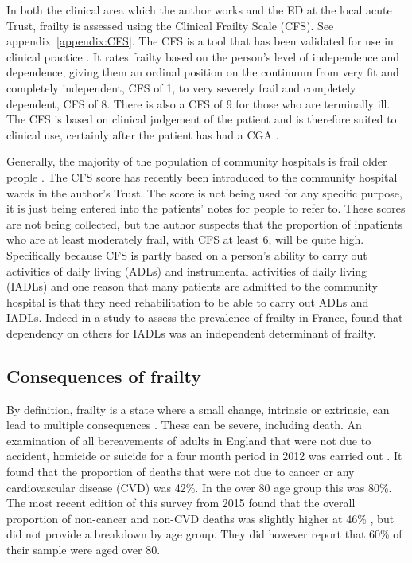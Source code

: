 \documentclass
[
	12pt,
	a4paper,
	oneside,
]{article}
\begin{document}
In both the clinical area which the author works and the ED at
the local acute Trust, frailty is assessed using the Clinical Frailty Scale (CFS).
See appendix~\ref{appendix:CFS}.
The CFS is a tool that has been validated for use in clinical practice 
\parencite{rockwood:05}. It rates frailty based on the person's level of independence
and dependence, giving them an ordinal position on the continuum from very fit and completely 
independent, CFS of 1, to very severely frail and completely dependent, CFS of 8.
There is also a CFS of 9 for those who are terminally ill. The CFS is based on clinical
judgement of the patient and is therefore suited to clinical use, certainly after
the patient has had a CGA \parencite{bgs:14}.

Generally, the majority of the population of community hospitals is frail older 
people \parencite{silver:12}.
The CFS score has recently been introduced to the community hospital wards in the author's Trust. The
score is not being used for any specific purpose, it is just being entered into 
the patients' notes for people to refer to. These scores are not being collected, 
but the author suspects that the proportion of inpatients who are at least 
moderately frail, with CFS at least 6, will be quite high. Specifically because
CFS is partly based on a person's ability to carry out activities of daily living (ADLs)
and instrumental activities of daily living (IADLs) and one reason that many patients
are admitted to the community hospital is that they need rehabilitation to be
able to carry out ADLs and IADLs. Indeed in a study to assess the prevalence of frailty
in France, \textcite{cossec:16} found that dependency on others for IADLs was an 
independent determinant of frailty.

\subsection{Consequences of frailty}

By definition, frailty is a state where a small change, intrinsic or extrinsic, can
lead to multiple consequences \parencite{collard:12}. These can be severe, including 
death. An examination
of all bereavements of adults in England that were not due to accident, homicide or suicide for 
a four month period in 2012 was 
carried out \parencite{ons:13}. It found that the proportion of deaths
that were not due to cancer or any cardiovascular disease (CVD) was 42\%. In the over 80
age group this was 80\%. The most recent edition of this survey from 2015 found
that the overall proportion of non-cancer and non-CVD deaths was slightly higher 
at 46\% \parencite{ons:16}, but did not provide a breakdown by age group. They 
did however report that 60\% of their sample were aged over 80.
\end{document}
